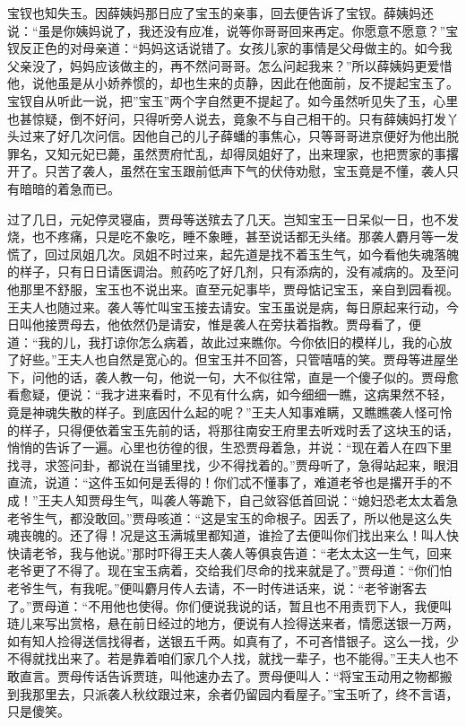\begin{parag}
    宝钗也知失玉。因薛姨妈那日应了宝玉的亲事，回去便告诉了宝钗。薛姨妈还说：“虽是你姨妈说了，我还没有应准，说等你哥哥回来再定。你愿意不愿意？”宝钗反正色的对母亲道：“妈妈这话说错了。女孩儿家的事情是父母做主的。如今我父亲没了，妈妈应该做主的，再不然问哥哥。怎么问起我来？”所以薛姨妈更爱惜他，说他虽是从小娇养惯的，却也生来的贞静，因此在他面前，反不提起宝玉了。宝钗自从听此一说，把”宝玉”两个字自然更不提起了。如今虽然听见失了玉，心里也甚惊疑，倒不好问，只得听旁人说去，竟象不与自己相干的。只有薛姨妈打发丫头过来了好几次问信。因他自己的儿子薛蟠的事焦心，只等哥哥进京便好为他出脱罪名，又知元妃已薨，虽然贾府忙乱，却得凤姐好了，出来理家，也把贾家的事撂开了。只苦了袭人，虽然在宝玉跟前低声下气的伏侍劝慰，宝玉竟是不懂，袭人只有暗暗的着急而已。
\end{parag}


\begin{parag}
    过了几日，元妃停灵寝庙，贾母等送殡去了几天。岂知宝玉一日呆似一日，也不发烧，也不疼痛，只是吃不象吃，睡不象睡，甚至说话都无头绪。那袭人麝月等一发慌了，回过凤姐几次。凤姐不时过来，起先道是找不着玉生气，如今看他失魂落魄的样子，只有日日请医调治。煎药吃了好几剂，只有添病的，没有减病的。及至问他那里不舒服，宝玉也不说出来。直至元妃事毕，贾母惦记宝玉，亲自到园看视。王夫人也随过来。袭人等忙叫宝玉接去请安。宝玉虽说是病，每日原起来行动，今日叫他接贾母去，他依然仍是请安，惟是袭人在旁扶着指教。贾母看了，便道：“我的儿，我打谅你怎么病着，故此过来瞧你。今你依旧的模样儿，我的心放了好些。”王夫人也自然是宽心的。但宝玉并不回答，只管嘻嘻的笑。贾母等进屋坐下，问他的话，袭人教一句，他说一句，大不似往常，直是一个傻子似的。贾母愈看愈疑，便说：“我才进来看时，不见有什么病，如今细细一瞧，这病果然不轻，竟是神魂失散的样子。到底因什么起的呢？”王夫人知事难瞒，又瞧瞧袭人怪可怜的样子，只得便依着宝玉先前的话，将那往南安王府里去听戏时丢了这块玉的话，悄悄的告诉了一遍。心里也彷徨的很，生恐贾母着急，并说：“现在着人在四下里找寻，求签问卦，都说在当铺里找，少不得找着的。”贾母听了，急得站起来，眼泪直流，说道：“这件玉如何是丢得的！你们忒不懂事了，难道老爷也是撂开手的不成！”王夫人知贾母生气，叫袭人等跪下，自己敛容低首回说：“媳妇恐老太太着急老爷生气，都没敢回。”贾母咳道：“这是宝玉的命根子。因丢了，所以他是这么失魂丧魄的。还了得！况是这玉满城里都知道，谁捡了去便叫你们找出来么！叫人快快请老爷，我与他说。”那时吓得王夫人袭人等俱哀告道：“老太太这一生气，回来老爷更了不得了。现在宝玉病着，交给我们尽命的找来就是了。”贾母道：“你们怕老爷生气，有我呢。”便叫麝月传人去请，不一时传进话来，说：“老爷谢客去了。”贾母道：“不用他也使得。你们便说我说的话，暂且也不用责罚下人，我便叫琏儿来写出赏格，悬在前日经过的地方，便说有人捡得送来者，情愿送银一万两，如有知人捡得送信找得者，送银五千两。如真有了，不可吝惜银子。这么一找，少不得就找出来了。若是靠着咱们家几个人找，就找一辈子，也不能得。”王夫人也不敢直言。贾母传话告诉贾琏，叫他速办去了。贾母便叫人：“将宝玉动用之物都搬到我那里去，只派袭人秋纹跟过来，余者仍留园内看屋子。”宝玉听了，终不言语，只是傻笑。
\end{parag}


